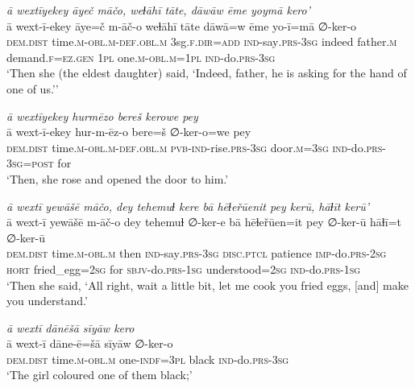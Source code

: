 \ea \label{ŽH.57}
\textit{ā wextīyekey āyeč māčo, weɫāhī tāte, dāwāw ēme yoymā kero’} \\ 
\gll ā wext-ī-ekey āye=č m-āč-o weɫāhī tāte dāwā=w ēme yo-ī=mā ∅-ker-o \\ 
 \textsc{dem.dist} time\textsc{.m}\textsc{-obl}\textsc{.m}\textsc{-def}\textsc{.obl}\textsc{.m} 3sg\textsc{\textsc{.f}}\textsc{.dir}\textsc{=add} \textsc{ind-}say\textsc{.prs}\textsc{-3sg} indeed father\textsc{.m} demand\textsc{\textsc{.f}}\textsc{=ez}\textsc{.gen} \textsc{1pl} one\textsc{.m}\textsc{-obl}\textsc{.m}\textsc{=1pl} \textsc{ind-}do\textsc{.prs}\textsc{-3sg} \\ 
\glt `Then she (the eldest daughter) said, ‘Indeed, father, he is asking for the hand of one of us.’'
\z 
 
\ea \label{ŽH.75}
\textit{ā wextīyekey hurmēzo bereš kerowe pey} \\ 
\gll ā wext-ī-ekey hur-m-ēz-o bere=š ∅-ker-o=we pey \\ 
 \textsc{dem.dist} time\textsc{.m}\textsc{-obl}\textsc{.m}\textsc{-def}\textsc{.obl}\textsc{.m} \textsc{pvb-}\textsc{ind-}rise\textsc{.prs}\textsc{-3sg} door\textsc{.m}\textsc{=3sg} \textsc{ind-}do\textsc{.prs}\textsc{-3sg}\textsc{=\textsc{post}} for \\ 
\glt `Then, she rose and opened the door to him.'
\z 
 
\ea \label{ŽH.79}
\textit{ā wextī yewāšē māčo, dey tehemuɫ kere bā hēɫeřūenit pey kerū, hāɫīt kerū'} \\ 
\gll ā wext-ī yewāšē m-āč-o dey tehemuɫ ∅-ker-e bā hēɫeřūen=it pey ∅-ker-ū hāɫī=t ∅-ker-ū \\ 
 \textsc{dem.dist} time\textsc{.m}\textsc{-obl}\textsc{.m} then \textsc{ind-}say\textsc{.prs}\textsc{-3sg} \textsc{disc.ptcl} patience \textsc{imp-}do\textsc{.prs}-\textsc{2sg} \textsc{hort} fried\_egg\textsc{=\textsc{2sg}} for \textsc{sbjv-}do\textsc{.prs}\textsc{-1sg} understood\textsc{=\textsc{2sg}} \textsc{ind-}do\textsc{.prs}\textsc{-1sg} \\ 
\glt `Then she said, ‘All right, wait a little bit, let me cook you fried eggs, [and] make you understand.'
\z 
 
\ea \label{ŽH.83}
\textit{ā wextī dānēšā sīyāw kero} \\ 
\gll ā wext-ī dāne-ē=šā sīyāw ∅-ker-o \\ 
 \textsc{dem.dist} time\textsc{.m}\textsc{-obl}\textsc{.m} one\textsc{-indf}\textsc{=3pl} black \textsc{ind-}do\textsc{.prs}\textsc{-3sg} \\ 
\glt `The girl coloured one of them black;'
\z 
 
